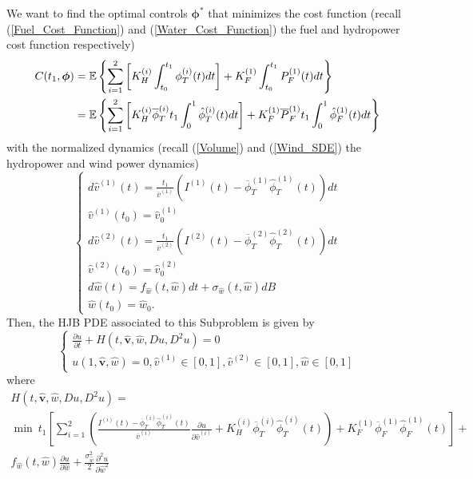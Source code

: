 We want to find the optimal controls $\bm{\phi}^*$ that minimizes the cost function (recall (\ref{Fuel_Cost_Function}) and (\ref{Water_Cost_Function}) the fuel and hydropower cost function respectively)
\begin{equation}
\begin{split}
C(t_1,\bm{\phi})&=\mathbb{E}\left\{\sum_{i=1}^2\left[K_H^{(i)}\int_{t_0}^{t_1}\phi_T^{(i)}(t)dt\right]+K_F^{(1)}\int_{t_0}^{t_1}P_F^{(1)}(t)dt\right\}\\
&=\mathbb{E}\left\{\sum_{i=1}^2\left[K_H^{(i)}\overline{\phi}_T^{(i)}t_1\int_{0}^{1}\hat{\phi}_T^{(i)}(t)dt\right]+K_F^{(1)}\overline{P}_F^{(1)}t_1\int_{0}^{1}\hat{\phi}_F^{(1)}(t)dt\right\}
\end{split}
\end{equation}
with the normalized dynamics (recall (\ref{Volume}) and (\ref{Wind_SDE}) the hydropower and wind power dynamics)
\begin{equation}
\begin{cases}
d\hat{v}^{(1)}(t)=\frac{t_1}{\overline{v}^{(1)}}\left(I^{(1)}(t)-\overline{\phi}_T^{(1)}\hat{\phi}_T^{(1)}(t)\right)dt\\
\hat{v}^{(1)}(t_0)=\hat{v}_0^{(1)}\\
d\hat{v}^{(2)}(t)=\frac{t_1}{\overline{v}^{(2)}}\left(I^{(2)}(t)-\overline{\phi}_T^{(2)}\hat{\phi}_T^{(2)}(t)\right)dt\\
\hat{v}^{(2)}(t_0)=\hat{v}_0^{(2)}\\
d\hat{w}(t)=f_{\hat{w}}(t,\hat{w})dt+\sigma_{\hat{w}}(t,\hat{w})dB\\
\hat{w}(t_0)=\hat{w}_0.
\end{cases}
\end{equation}
Then, the HJB PDE associated to this Subproblem is given by
\begin{equation}
\begin{cases}
\frac{\partial u}{\partial t}+H(t,\hat{\bm{v}},\hat{w},Du,D^2u)=0\\
u(1,\hat{\bm{v}},\hat{w})=0,\hat{v}^{(1)}\in[0,1],\hat{v}^{(2)}\in[0,1],\hat{w}\in[0,1]
\end{cases}
\label{HJB_Subproblem_3}
\end{equation}
where
\begin{multline}
H(t,\hat{\bm{v}},\hat{w},Du,D^2u)=\\
\min\ t_1\left[\sum_{i=1}^2\left(\frac{I^{(i)}(t)-\overline{\phi}_T^{(i)}\hat{\phi}_T^{(i)}(t)}{\overline{v}^{(i)}}\frac{\partial u}{\partial \hat{v}^{(i)}}+K_H^{(i)}\overline{\phi}_T^{(i)}\hat{\phi}_T^{(i)}(t)\right)+K_F^{(1)}\overline{\phi}_F^{(1)}\hat{\phi}_F^{(1)}(t)\right]+\\
f_{\hat{w}}(t,\hat{w})\frac{\partial u}{\partial\hat{w}}+\frac{\sigma^2_{\hat{w}}}{2}\frac{\partial^2 u}{\partial\hat{w}^2}
\label{Hamiltonian_3}
\end{multline}
